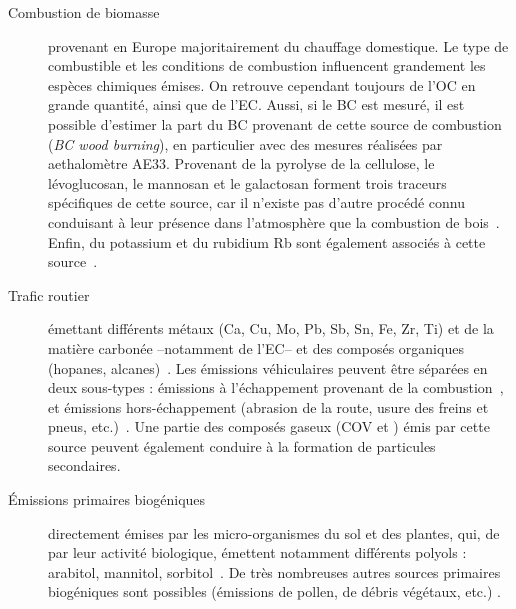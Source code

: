\begin{description}
    \item[Combustion de biomasse] provenant en Europe majoritairement du chauffage
        domestique. Le type de combustible et les conditions de combustion influencent
        grandement les espèces chimiques émises. On retrouve cependant toujours de
        l'OC en grande quantité, ainsi que de l'EC. Aussi, si le BC est mesuré, il est
        possible d'estimer la part du BC provenant de cette source de combustion \BCwb{}
        (\textit{BC wood burning}), en particulier avec des mesures réalisées par
        aethalomètre AE33.
        Provenant de la pyrolyse de la cellulose, le lévoglucosan, le mannosan et
        le galactosan forment trois traceurs spécifiques de cette source, car il n'existe
        pas d'autre procédé connu conduisant à leur présence dans l'atmosphère que la
        combustion de
        bois~\autocite{jordanLevoglucosan2006,puxbaumLevoglucosan2007}.
        Enfin, du potassium  et du rubidium Rb sont également associés à cette
        source~\autocite{navaBiomass2015,gollyEtude2014,chevrierChauffage2016}.

    \item[Trafic routier] émettant différents métaux (Ca, Cu, Mo, Pb, Sb, Sn, Fe, Zr,
        Ti) et de la matière carbonée --notamment de l'EC-- et des composés organiques
        (hopanes, alcanes)~\autocite{schauerCharacterization2006,charronIdentification2019}. Les émissions
        véhiculaires peuvent être séparées en deux sous-types : émissions à l'échappement
        provenant de la combustion~\autocite{allenSize2001,huMetals2009,vianaSource2008},
        et émissions hors-échappement (abrasion de la route, usure des freins et pneus,
        etc.)~\autocite{grigoratosBrake2015,sandersAirborne2003,sternbeckMetal2002}.
        Une partie des composés gaseux (COV et ) émis par cette source peuvent
        également conduire à la formation de particules secondaires.

    \item[Émissions primaires biogéniques] directement émises par les micro-organismes du sol
        et des plantes, qui, de par leur activité biologique, émettent notamment
        différents polyols : arabitol, mannitol,
        sorbitol~\autocite{bauerSignificant2008,yttriAmbient2007,samakePolyols2019}. De
        très nombreuses autres sources primaires biogéniques sont possibles (émissions de
        pollen, de débris végétaux, etc.) \autocite{samakePolyols2019}.


\end{description}
